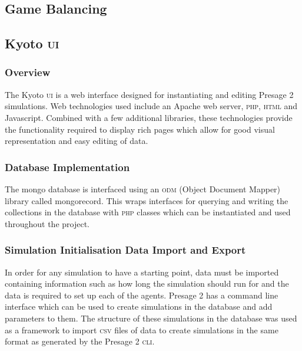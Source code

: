 \subsection{Game Balancing}


\subsection{Kyoto \textsc{ui}}

\subsubsection{Overview}

The Kyoto \textsc{ui} is a web interface designed for instantiating and editing Presage 2 simulations. Web technologies used include an Apache web server, \textsc{php}, \textsc{html} and Javascript. Combined with a few additional libraries, these technologies provide the functionality required to display rich pages which allow for good visual representation and easy editing of data.

\subsubsection{Database Implementation}

The mongo database is interfaced using an \textsc{odm} (Object Document Mapper) library called mongorecord. This wraps interfaces for querying and writing the collections in the database with \textsc{php} classes which can be instantiated and used throughout the project.

\subsubsection{Simulation Initialisation Data Import and Export}

In order for any simulation to have a starting point, data must be imported containing information such as how long the simulation should run for and the data is required to set up each of the agents. Presage 2 has a command line interface which can be used to create simulations in the database and add parameters to them. The structure of these simulations in the database was used as a framework to import \textsc{csv} files of data to create simulations in the same format as generated by the Presage 2 \textsc{cli}.

